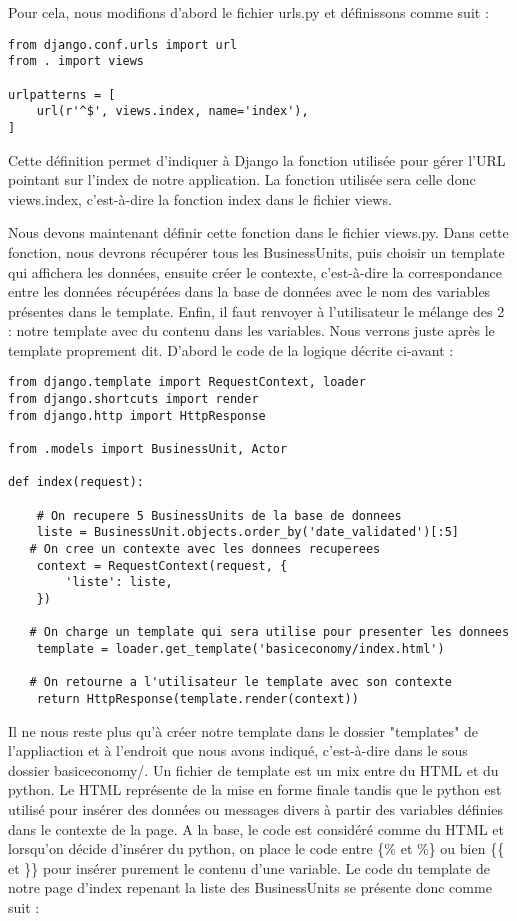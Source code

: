 Pour cela,  nous modifions d'abord le fichier urls.py et définissons comme suit : 

\begin{lstlisting}
from django.conf.urls import url
from . import views

urlpatterns = [
    url(r'^$', views.index, name='index'),
]
\end{lstlisting}

Cette définition permet d'indiquer à Django la fonction utilisée pour gérer l'URL pointant sur l'index de notre application.  La fonction utilisée sera celle donc views.index,  c'est-à-dire la fonction index dans le fichier views.  

Nous devons maintenant définir cette fonction dans le fichier views.py.  Dans cette fonction,  nous devrons récupérer tous les BusinessUnits,  puis choisir un template qui affichera les données,  ensuite créer le contexte,  c'est-à-dire la correspondance entre les données récupérées dans la base de données avec le nom des variables présentes dans le template.  Enfin,  il faut renvoyer à l'utilisateur le mélange des 2 : notre template avec du contenu dans les variables.  Nous verrons juste après le template proprement dit.  D'abord le code de la logique décrite ci-avant : 

\begin{lstlisting}
from django.template import RequestContext, loader
from django.shortcuts import render
from django.http import HttpResponse

from .models import BusinessUnit, Actor

def index(request):

    # On recupere 5 BusinessUnits de la base de donnees
    liste = BusinessUnit.objects.order_by('date_validated')[:5]
   # On cree un contexte avec les donnees recuperees
    context = RequestContext(request, {
        'liste': liste,
    })

   # On charge un template qui sera utilise pour presenter les donnees
    template = loader.get_template('basiceconomy/index.html')

   # On retourne a l'utilisateur le template avec son contexte
    return HttpResponse(template.render(context))

\end{lstlisting}

Il ne nous reste plus qu'à créer notre template dans le dossier "templates" de l'appliaction et à l'endroit que nous avons indiqué,  c'est-à-dire dans le sous dossier basiceconomy/.  Un fichier de template est un mix entre du HTML et du python.  Le HTML représente de la mise en forme finale tandis que le python est utilisé pour insérer des données ou messages divers à partir des variables définies dans le contexte de la page.  A la base,  le code est considéré comme du HTML et lorsqu'on décide d'insérer du python,  on place le code entre \{\% et \%\} ou bien \{\{ et \}\} pour insérer purement le contenu d'une variable.  Le code du template de notre page d'index repenant la liste des BusinessUnits se présente donc comme suit : 

